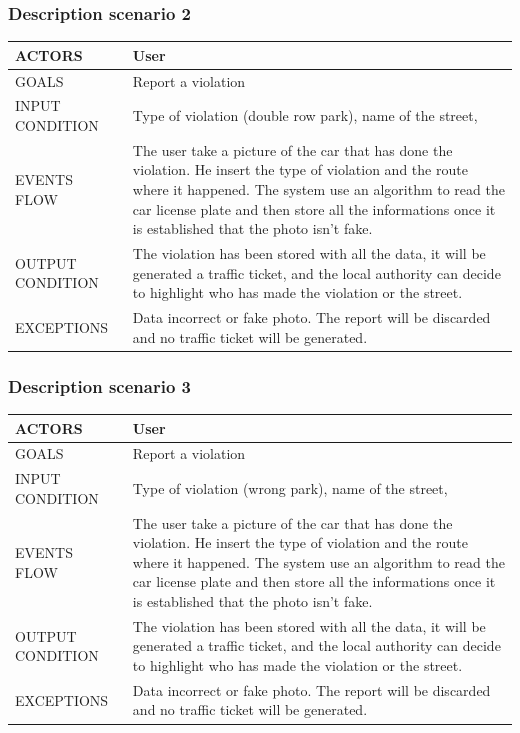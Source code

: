\subsubsection{Description scenario 2}

\begin{center}
	\begin{tabular}{ | l | p{6cm} | } 
		\hline
		ACTORS & User  \\ 
		\hline
		GOALS & Report a violation  \\ 
		\hline
		INPUT CONDITION & Type of violation (double row park), name of the street,  \\ 
		\hline
		EVENTS FLOW & The user take a picture of the car that has done the violation. He insert the type of violation and the route where it happened. The system use an algorithm to read the car license plate and then store all the informations once it is established that the photo isn't fake.  \\ 
		\hline
		OUTPUT CONDITION & The violation has been stored with all the data, it will be generated a traffic ticket, and the local authority can decide to highlight who has made the violation or the street. \\ 
		\hline
		EXCEPTIONS & Data incorrect or fake photo. The report will be discarded and no traffic ticket will be generated.  \\ 
		\hline
	\end{tabular}
\end{center}
\newpage
\subsubsection{Description scenario 3}

\begin{center}
	\begin{tabular}{ | l | p{6cm} | } 
		\hline
		ACTORS & User  \\ 
		\hline
		GOALS & Report a violation  \\ 
		\hline
		INPUT CONDITION & Type of violation (wrong park), name of the street,  \\ 
		\hline
		EVENTS FLOW & The user take a picture of the car that has done the violation. He insert the type of violation and the route where it happened. The system use an algorithm to read the car license plate and then store all the informations once it is established that the photo isn't fake.  \\ 
		\hline
		OUTPUT CONDITION & The violation has been stored with all the data, it will be generated a traffic ticket, and the local authority can decide to highlight who has made the violation or the street. \\ 
		\hline
		EXCEPTIONS & Data incorrect or fake photo. The report will be discarded and no traffic ticket will be generated.  \\ 
		\hline
	\end{tabular}
\end{center}

